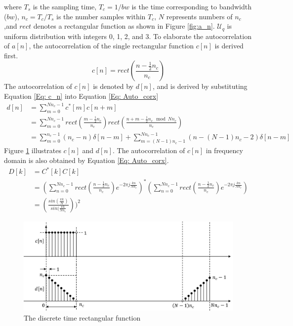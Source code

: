 \documentclass[draftcls,onecolumn]{IEEEtran}  %
\begin{document}
where $T_s$ is the sampling time, $T_c=1/bw$ is the time corresponding to bandwidth ($bw$), $n_c=T_c/T_s$ is the number samples within $T_c$, $N$ represents numbers of $n_c$ ,and $rect$ denotes a rectangular function as shown in Figure \ref{fig:a_n}. $\mathcal{U}_q$ is uniform distribution with integers 0, 1, 2, and 3. To elaborate the autocorrelation of $a[n]$, the autocorrelation of the single rectangular function $c[n]$ is derived first. 
\begin{equation}\label{Eq: c_n}
c[n] = rect(\frac{n-\frac{1}{2} n_c}{n_c})
\end{equation}
The autocorrelation of $c[n]$ is denoted by $d[n]$, and is derived by substituting Equation \ref{Eq: c_n} into Equation \ref{Eq: Auto_corx}
\begin{equation}\label{Eq: d_n}
\begin{split}
d[n] &= \sum\limits_{m=0}^{Nn_c-1} c^*[m] c[n+m] \\
	 &= \sum\limits_{m=0}^{Nn_c-1} rect(\frac{m-\frac{1}{2} n_c}{n_c}) rect(\frac{n+m-\frac{1}{2} n_c \mod Nn_c}{n_c}) \\
     &= \sum\limits_{m=0}^{n_c-1} (n_c-n)\delta[n-m] + 
        \sum\limits_{m=(N-1)n_c-1}^{Nn_c-1} (n-(N-1)n_c-2)\delta[n-m] 
\end{split}
\end{equation}
Figure \ref{fig:c_n_d_n} illustrates $c[n]$ and $d[n]$. The autocorrelation of $c[n]$ in frequency domain is also obtained by Equation \ref{Eq: Auto_corx}.
\begin{equation}\label{Eq: D_k}
\begin{split}
D[k] &= C^*[k] C[k] \\
	 &= (\sum\limits_{n=0}^{Nn_c-1} rect(\frac{n-\frac{1}{2} n_c}{n_c}) e^{-2\pi j \frac{kn}{Nn_c}})^* 
     (\sum\limits_{n=0}^{Nn_c-1} rect(\frac{n-\frac{1}{2} n_c}{n_c}) e^{-2\pi j \frac{kn}{Nn_c}} ) \\
     &= (\frac{ sin(\frac{\pi k}{N})}{sin(\frac{\pi k}{N n_c}}))^2
\end{split}
\end{equation}
\begin{figure}[t!]
	\centering
	\includegraphics[width=3 in]{pdf/rect_auto.jpg}
	\caption{The discrete time rectangular function}
	\label{fig:c_n_d_n}
\end{figure}
\end{document}
